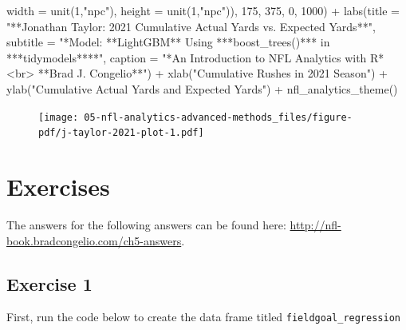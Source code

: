 \documentclass[
  letterpaper,
]{krantz}
\newenvironment{Shaded}{\begin{snugshade}}{\end{snugshade}}
\newcommand{\AttributeTok}[1]{\textcolor[rgb]{0.40,0.45,0.13}{#1}}
\newcommand{\DecValTok}[1]{\textcolor[rgb]{0.68,0.00,0.00}{#1}}
\newcommand{\FunctionTok}[1]{\textcolor[rgb]{0.28,0.35,0.67}{#1}}
\newcommand{\NormalTok}[1]{\textcolor[rgb]{0.00,0.23,0.31}{#1}}
\newcommand{\SpecialCharTok}[1]{\textcolor[rgb]{0.37,0.37,0.37}{#1}}
\newcommand{\StringTok}[1]{\textcolor[rgb]{0.13,0.47,0.30}{#1}}
\begin{document}
\begin{Shaded}
\begin{Highlighting}[]
                               \AttributeTok{width =} \FunctionTok{unit}\NormalTok{(}\DecValTok{1}\NormalTok{,}\StringTok{"npc"}\NormalTok{), }
                               \AttributeTok{height =} \FunctionTok{unit}\NormalTok{(}\DecValTok{1}\NormalTok{,}\StringTok{"npc"}\NormalTok{)),}
                    \DecValTok{175}\NormalTok{, }\DecValTok{375}\NormalTok{, }\DecValTok{0}\NormalTok{, }\DecValTok{1000}\NormalTok{) }\SpecialCharTok{+}
  \FunctionTok{labs}\NormalTok{(}\AttributeTok{title =} \StringTok{"**Jonathan Taylor: 2021 Cumulative Actual Yards}
\StringTok{       vs. Expected Yards**"}\NormalTok{,}
       \AttributeTok{subtitle =} \StringTok{"*Model: **LightGBM** Using ***boost\_trees()***}
\StringTok{       in ***tidymodels****"}\NormalTok{,}
       \AttributeTok{caption =} \StringTok{"*An Introduction to NFL Analytics with R*\textless{}br\textgreater{}}
\StringTok{       **Brad J. Congelio**"}\NormalTok{) }\SpecialCharTok{+}
  \FunctionTok{xlab}\NormalTok{(}\StringTok{"Cumulative Rushes in 2021 Season"}\NormalTok{) }\SpecialCharTok{+}
  \FunctionTok{ylab}\NormalTok{(}\StringTok{"Cumulative Actual Yards and Expected Yards"}\NormalTok{) }\SpecialCharTok{+}
  \FunctionTok{nfl\_analytics\_theme}\NormalTok{()}
\end{Highlighting}
\end{Shaded}

\begin{figure}[H]

{\centering \texttt{[image: 05-nfl-analytics-advanced-methods\_files/figure-pdf/j-taylor-2021-plot-1.pdf]}

}

\end{figure}

\hypertarget{exercises-3}{%
\section{Exercises}\label{exercises-3}}

The answers for the following answers can be found here:
\url{http://nfl-book.bradcongelio.com/ch5-answers}.

\hypertarget{exercise-1-3}{%
\subsection{Exercise 1}\label{exercise-1-3}}

First, run the code below to create the data frame titled
\texttt{fieldgoal\_regression}
\end{document}
